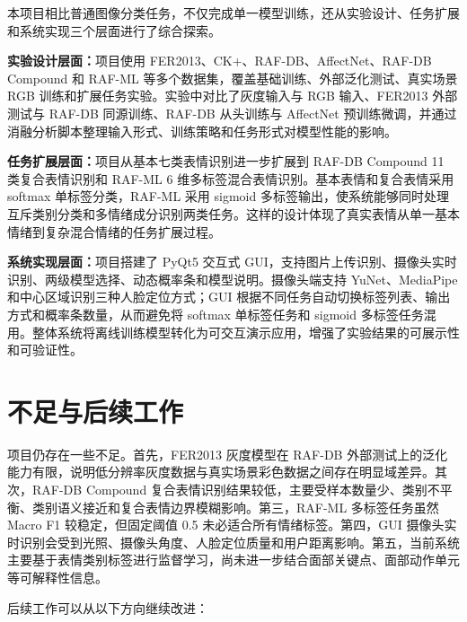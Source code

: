 \documentclass[UTF8,a4paper,12pt]{ctexart}
\begin{document}
本项目相比普通图像分类任务，不仅完成单一模型训练，还从实验设计、任务扩展和系统实现三个层面进行了综合探索。

\textbf{实验设计层面：}项目使用 FER2013、CK+、RAF-DB、AffectNet、RAF-DB Compound 和 RAF-ML 等多个数据集，覆盖基础训练、外部泛化测试、真实场景 RGB 训练和扩展任务实验。实验中对比了灰度输入与 RGB 输入、FER2013 外部测试与 RAF-DB 同源训练、RAF-DB 从头训练与 AffectNet 预训练微调，并通过消融分析脚本整理输入形式、训练策略和任务形式对模型性能的影响。

\textbf{任务扩展层面：}项目从基本七类表情识别进一步扩展到 RAF-DB Compound 11 类复合表情识别和 RAF-ML 6 维多标签混合表情识别。基本表情和复合表情采用 softmax 单标签分类，RAF-ML 采用 sigmoid 多标签输出，使系统能够同时处理互斥类别分类和多情绪成分识别两类任务。这样的设计体现了真实表情从单一基本情绪到复杂混合情绪的任务扩展过程。

\textbf{系统实现层面：}项目搭建了 PyQt5 交互式 GUI，支持图片上传识别、摄像头实时识别、两级模型选择、动态概率条和模型说明。摄像头端支持 YuNet、MediaPipe 和中心区域识别三种人脸定位方式；GUI 根据不同任务自动切换标签列表、输出方式和概率条数量，从而避免将 softmax 单标签任务和 sigmoid 多标签任务混用。整体系统将离线训练模型转化为可交互演示应用，增强了实验结果的可展示性和可验证性。

\section{不足与后续工作}

项目仍存在一些不足。首先，FER2013 灰度模型在 RAF-DB 外部测试上的泛化能力有限，说明低分辨率灰度数据与真实场景彩色数据之间存在明显域差异。其次，RAF-DB Compound 复合表情识别结果较低，主要受样本数量少、类别不平衡、类别语义接近和复合表情边界模糊影响。第三，RAF-ML 多标签任务虽然 Macro F1 较稳定，但固定阈值 0.5 未必适合所有情绪标签。第四，GUI 摄像头实时识别会受到光照、摄像头角度、人脸定位质量和用户距离影响。第五，当前系统主要基于表情类别标签进行监督学习，尚未进一步结合面部关键点、面部动作单元等可解释性信息。

后续工作可以从以下方向继续改进：
\end{document}
